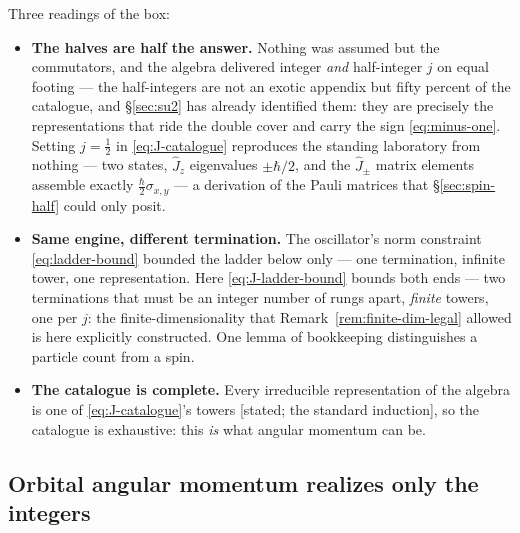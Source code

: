 \documentclass[11pt]{article}
\theoremstyle{plain}
\theoremstyle{definition}
\theoremstyle{remark}
\newcommand{\op}[1]{\hat{#1}}
\begin{document}
Three readings of the box:
\begin{itemize}
  \item \textbf{The halves are half the answer.} Nothing was
  assumed but the commutators, and the algebra delivered integer
  \emph{and} half-integer $j$ on equal footing --- the
  half-integers are not an exotic appendix but fifty percent of the
  catalogue, and \S\ref{sec:su2} has already identified them:
  they are precisely the representations that ride the
  double cover and carry the sign \eqref{eq:minus-one}. Setting
  $j = \tfrac12$ in \eqref{eq:J-catalogue} reproduces the standing
  laboratory from nothing --- two states, $\op J_z$ eigenvalues
  $\pm\hbar/2$, and the $\op J_\pm$ matrix elements assemble
  exactly $\tfrac\hbar2\sigma_{x, y}$ --- a derivation of the
  Pauli matrices that \S\ref{sec:spin-half} could only posit.
  \item \textbf{Same engine, different termination.} The oscillator's
  norm constraint \eqref{eq:ladder-bound} bounded the ladder below only
  --- one termination, infinite tower, one representation. Here
  \eqref{eq:J-ladder-bound} bounds both ends --- two terminations
  that must be an integer number of rungs apart, \emph{finite}
  towers, one per $j$: the finite-dimensionality that
  Remark~\ref{rem:finite-dim-legal} allowed is here explicitly
  constructed. One lemma of bookkeeping distinguishes a
  particle count from a spin.
  \item \textbf{The catalogue is complete.} Every irreducible
  representation of the algebra is one of
  \eqref{eq:J-catalogue}'s towers [stated; the standard
  induction], so the catalogue is exhaustive: this \emph{is}
  what angular momentum can be.
\end{itemize}

\subsection{Orbital angular momentum realizes only the integers}
\label{sec:orbital-integers}
\end{document}
